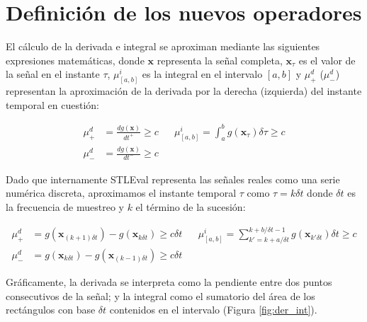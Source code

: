 \section{Definición de los nuevos operadores}

El cálculo de la derivada e integral se aproximan mediante las siguientes expresiones matemáticas, donde $\mathbf{x}$ representa la señal completa, $\mathbf{x}_{\tau}$ es el valor de la señal en el instante $\tau$, $\mu^i_{[a,b]}$ es la integral en el intervalo $[a, b]$ y $\mu^d_{+}$ ($\mu^d_{-}$) representan la aproximación de la derivada por la derecha (izquierda) del instante temporal en cuestión:

\begin{align*}
\mu^d_{+} &= \frac{dg(\mathbf{x})}{dt^+} \geq c & & \mu^i_{[a,b]} = \int^{b}_{a} g(\mathbf{x}_{\tau}) \delta \tau \geq c \\
\mu^d_{-} &= \frac{dg(\mathbf{x})}{dt^-} \geq c &
\end{align*}

Dado que internamente STLEval representa las señales reales como una serie numérica discreta, aproximamos el instante temporal $\tau$ como $\tau = k \delta t$ donde $\delta t$ es la frecuencia de muestreo y $k$ el término de la sucesión:

\begin{align*}
\mu^d_{+} &= g(\mathbf{x}_{(k + 1) \delta t}) - g(\mathbf{x}_{k \delta t}) \geq c \delta t & & \mu^i_{[a,b]} = \sum^{k + b / \delta t - 1}_{k' = k + a / \delta t} g(\mathbf{x}_{k' \delta t}) \delta t \geq c \\
\mu^d_{-} &= g(\mathbf{x}_{k \delta t}) - g(\mathbf{x}_{(k - 1) \delta t}) \geq c \delta t & 
\end{align*}

Gráficamente, la derivada se interpreta como la pendiente entre dos puntos consecutivos de la señal; y la integral como el sumatorio del área de los rectángulos con base  $\delta t$ contenidos en el intervalo (Figura \ref{fig:der_int}). 

